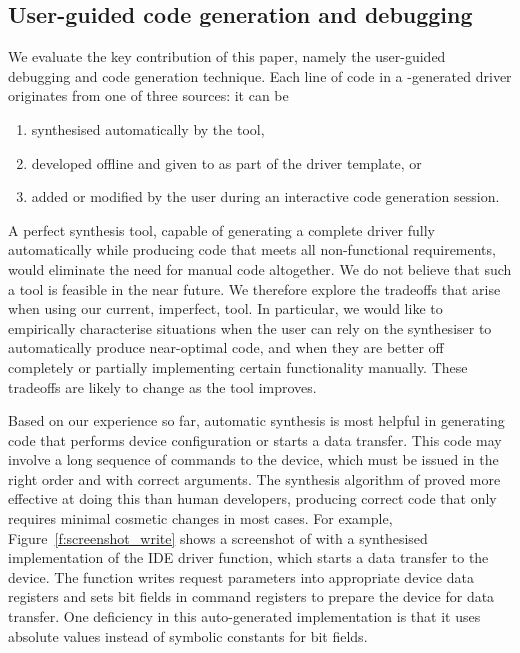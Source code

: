 
\subsection{User-guided code generation and debugging} 
We evaluate the key contribution of this paper, namely the user-guided debugging and code generation technique.  Each line of code in a \termite-generated driver originates from one of three sources: it can be 
\begin{enumerate} 
    \item synthesised automatically by the tool, 
    \item developed offline and given to \termite as part of the driver template, or 
    \item added or modified by the user during an interactive code generation session.  
\end{enumerate}
A perfect synthesis tool, capable of generating a complete driver fully automatically while producing code that meets all non-functional requirements, would eliminate the need for manual code altogether.  We do not believe that such a tool is feasible in the near future.  We therefore explore the tradeoffs that arise when using our current, imperfect, tool.  In particular, we would like to empirically characterise situations when the user can rely on the synthesiser to automatically produce near-optimal code, and when they are better off completely or partially implementing certain functionality manually.  These tradeoffs are likely to change as the tool improves.

Based on our experience so far, automatic synthesis is most helpful in generating code that performs device configuration or starts a data transfer.  This code may involve a long sequence of commands to the device, which must be issued in the right order and with correct arguments.  The synthesis algorithm of \termite proved more effective at doing this than human developers, producing correct code that only requires minimal cosmetic changes in most cases.  For example, Figure~\ref{f:screenshot_write} shows a screenshot of \termite with a synthesised implementation of the IDE driver  function, which starts a data transfer to the device.  The function writes request parameters into appropriate device data registers and sets bit fields in command registers to prepare the device for data transfer.  One deficiency in this auto-generated implementation is that it uses absolute values instead of symbolic constants for bit fields.

